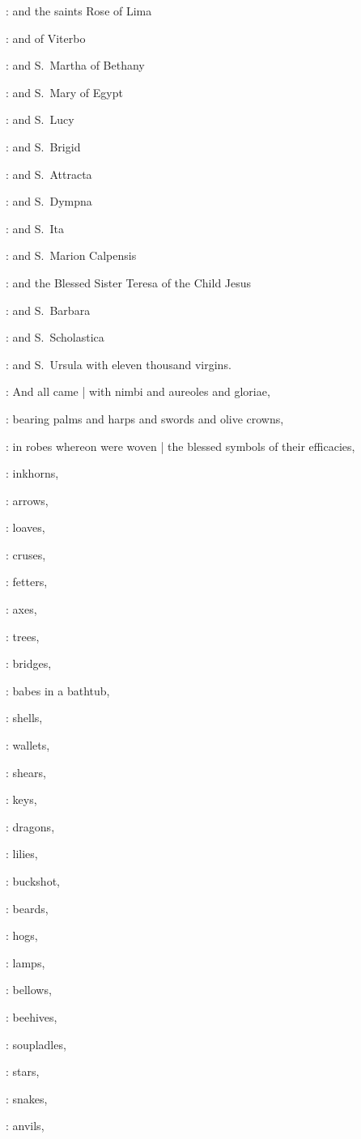 :
and the saints Rose of Lima

:
and of Viterbo

:
and S.~Martha of Bethany

:
and S.~Mary of Egypt

:
and S.~Lucy

:
and S.~Brigid

:
and S.~Attracta

:
and S.~Dympna

:
and S.~Ita

:
and S.~Marion Calpensis

:
and the Blessed Sister Teresa of the Child Jesus

:
and S.~Barbara

:
and S.~Scholastica

:
and S.~Ursula with eleven thousand virgins.

:
And all came |
with nimbi and aureoles and gloriae,

:
bearing palms and harps and swords and olive crowns,

:
in robes whereon were woven |
the blessed symbols of their efficacies,

:
inkhorns,

:
arrows,

:
loaves,

:
cruses,

:
fetters,

:
axes,

:
trees,

:
bridges,

:
babes in a bathtub,

:
shells,

:
wallets,

:
shears,

:
keys,

:
dragons,

:
lilies,

:
buckshot,

:
beards,

:
hogs,

:
lamps,

:
bellows,

:
beehives,

:
soupladles,

:
stars,

:
snakes,

:
anvils,


